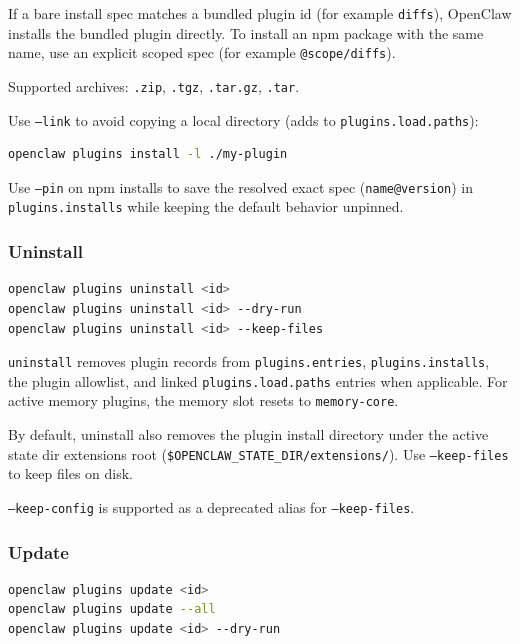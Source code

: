 If a bare install spec matches a bundled plugin id (for example \texttt{diffs}), OpenClaw
installs the bundled plugin directly. To install an npm package with the same
name, use an explicit scoped spec (for example \texttt{@scope/diffs}).

Supported archives: \texttt{.zip}, \texttt{.tgz}, \texttt{.tar.gz}, \texttt{.tar}.

Use \texttt{--link} to avoid copying a local directory (adds to \texttt{plugins.load.paths}):

\begin{lstlisting}[language=bash]
openclaw plugins install -l ./my-plugin
\end{lstlisting}


Use \texttt{--pin} on npm installs to save the resolved exact spec (\texttt{name@version}) in
\texttt{plugins.installs} while keeping the default behavior unpinned.

\subsubsection{Uninstall}


\begin{lstlisting}[language=bash]
openclaw plugins uninstall <id>
openclaw plugins uninstall <id> --dry-run
openclaw plugins uninstall <id> --keep-files
\end{lstlisting}


\texttt{uninstall} removes plugin records from \texttt{plugins.entries}, \texttt{plugins.installs},
the plugin allowlist, and linked \texttt{plugins.load.paths} entries when applicable.
For active memory plugins, the memory slot resets to \texttt{memory-core}.

By default, uninstall also removes the plugin install directory under the active
state dir extensions root (\texttt{\$OPENCLAW\_STATE\_DIR/extensions/}). Use
\texttt{--keep-files} to keep files on disk.

\texttt{--keep-config} is supported as a deprecated alias for \texttt{--keep-files}.

\subsubsection{Update}


\begin{lstlisting}[language=bash]
openclaw plugins update <id>
openclaw plugins update --all
openclaw plugins update <id> --dry-run
\end{lstlisting}



